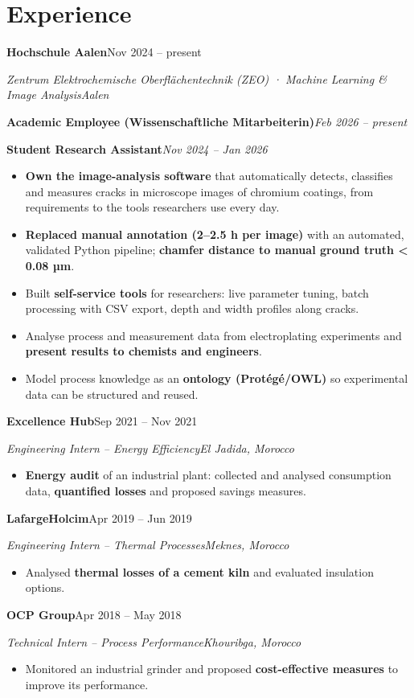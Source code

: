 \documentclass[10pt,a4paper]{article}
\newcommand{\org}[4]{%
  \par\vspace{4pt}\noindent\textbf{#1}\hfill #2\par
  \noindent\textit{#3}\hfill\textit{#4}\par}
\newcommand{\role}[2]{\par\vspace{1pt}\noindent\textbf{#1}\hfill\textit{#2}\par}
\begin{document}
\section{Experience}
\org{Hochschule Aalen}{Nov 2024 -- present}{Zentrum Elektrochemische Oberflächentechnik (ZEO) · Machine Learning \& Image Analysis}{Aalen}
\role{Academic Employee (Wissenschaftliche Mitarbeiterin)}{Feb 2026 -- present}
\role{Student Research Assistant}{Nov 2024 -- Jan 2026}
\begin{itemize}
  \item \textbf{Own the image-analysis software} that automatically detects, classifies and measures cracks in microscope images of chromium coatings, from requirements to the tools researchers use every day.
  \item \textbf{Replaced manual annotation (2--2.5 h per image)} with an automated, validated Python pipeline; \textbf{chamfer distance to manual ground truth < 0.08 µm}.
  \item Built \textbf{self-service tools} for researchers: live parameter tuning, batch processing with CSV export, depth and width profiles along cracks.
  \item Analyse process and measurement data from electroplating experiments and \textbf{present results to chemists and engineers}.
  \item Model process knowledge as an \textbf{ontology (Protégé/OWL)} so experimental data can be structured and reused.
\end{itemize}

\org{Excellence Hub}{Sep 2021 -- Nov 2021}{Engineering Intern -- Energy Efficiency}{El Jadida, Morocco}
\begin{itemize}
  \item \textbf{Energy audit} of an industrial plant: collected and analysed consumption data, \textbf{quantified losses} and proposed savings measures.
\end{itemize}

\org{LafargeHolcim}{Apr 2019 -- Jun 2019}{Engineering Intern -- Thermal Processes}{Meknes, Morocco}
\begin{itemize}
  \item Analysed \textbf{thermal losses of a cement kiln} and evaluated insulation options.
\end{itemize}

\org{OCP Group}{Apr 2018 -- May 2018}{Technical Intern -- Process Performance}{Khouribga, Morocco}
\begin{itemize}
  \item Monitored an industrial grinder and proposed \textbf{cost-effective measures} to improve its performance.
\end{itemize}
\end{document}
